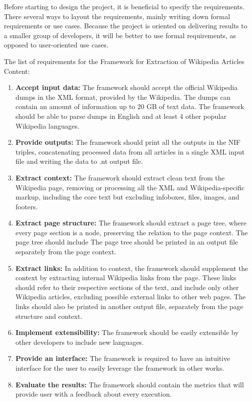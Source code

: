 \documentclass[thesis=M,english,hidelinks]{FITthesis}[2019/12/23]
\begin{document}
Before starting to design the project, it is beneficial to specify the requirements. There several ways to layout the requirements, mainly writing down formal requirements or use cases. Because the project is oriented on delivering results to a smaller group of developers, it will be better to use formal requirements, as opposed to user-oriented use cases.

The list of requirements for the Framework for Extraction of Wikipedia Articles Content:

\begin{enumerate}
	\item \textbf{Accept input data:} The framework should accept the official  Wikipedia dumps in the \gls{XML} format, provided by the Wikipedia. The dumps can contain an amount of information up to 20 GB of text data. The framework should be able to parse dumps in English and at least 4 other popular Wikipedia languages.
	\item \textbf{Provide outputs:} The framework should print all the outputs in the \gls{NIF} triples, concatenating processed data from all articles in a single \gls{XML} input file and writing the data to .nt output file.
	\item \textbf{Extract context:} The framework should extract clean text from the Wikipedia page, removing or processing all the \gls{XML} and Wikipedia-specific markup, including the core text but excluding infoboxes, files, images, and footers.
	\item \textbf{Extract page structure:} The framework should extract a page tree, where every page section is a node, preserving the relation to the page context. The page tree should include The page tree should be printed in an output file separately from the page context. 
	\item \textbf{Extract links:} In addition to context, the framework should supplement the context by extracting internal Wikipedia links from the page. These links should refer to their respective sections of the text, and include only other Wikipedia articles, excluding possible external links to other web pages. The links should also be printed in another output file, separately from the page structure and context.
	\item \textbf{Implement extensibility:} The framework should be easily extensible by other developers to include new languages.
	\item \textbf{Provide an interface:} The framework is required to have an intuitive interface for the user to easily leverage the framework in other works.
	\item \textbf{Evaluate the results:} The framework should contain the metrics that will provide user with a feedback about every execution.
\end{enumerate} 
\end{document}
